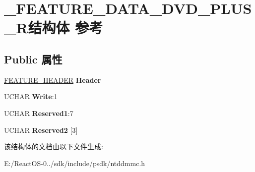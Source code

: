 \hypertarget{struct___f_e_a_t_u_r_e___d_a_t_a___d_v_d___p_l_u_s___r}{}\section{\+\_\+\+F\+E\+A\+T\+U\+R\+E\+\_\+\+D\+A\+T\+A\+\_\+\+D\+V\+D\+\_\+\+P\+L\+U\+S\+\_\+\+R结构体 参考}
\label{struct___f_e_a_t_u_r_e___d_a_t_a___d_v_d___p_l_u_s___r}
\subsection*{Public 属性}
\begin{DoxyCompactItemize}
\item 
\mbox{\label{struct___f_e_a_t_u_r_e___d_a_t_a___d_v_d___p_l_u_s___r_a6ad521a0cc8b52910c374140e025ee18}} 
\hyperlink{struct___f_e_a_t_u_r_e___h_e_a_d_e_r}{F\+E\+A\+T\+U\+R\+E\+\_\+\+H\+E\+A\+D\+ER} {\bfseries Header}
\item 
\mbox{\label{struct___f_e_a_t_u_r_e___d_a_t_a___d_v_d___p_l_u_s___r_ad07e733122453ee376f28e7f9543d5f9}} 
U\+C\+H\+AR {\bfseries Write}\+:1
\item 
\mbox{\label{struct___f_e_a_t_u_r_e___d_a_t_a___d_v_d___p_l_u_s___r_a811129c2e7274b027c8ca53fa3aebd5e}} 
U\+C\+H\+AR {\bfseries Reserved1}\+:7
\item 
\mbox{\label{struct___f_e_a_t_u_r_e___d_a_t_a___d_v_d___p_l_u_s___r_a4d1d11c4fdf233bcafdf8a5589d41525}} 
U\+C\+H\+AR {\bfseries Reserved2} \mbox{[}3\mbox{]}
\end{DoxyCompactItemize}


该结构体的文档由以下文件生成\+:\begin{DoxyCompactItemize}
\item 
E\+:/\+React\+O\+S-\/0../sdk/include/psdk/ntddmmc.\+h\end{DoxyCompactItemize}
